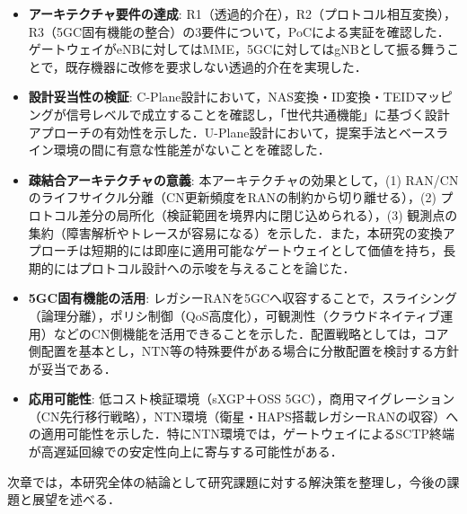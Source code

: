 \begin{itemize}
    \item \textbf{アーキテクチャ要件の達成}: R1（透過的介在），R2（プロトコル相互変換），R3（5GC固有機能の整合）の3要件について，PoCによる実証を確認した．ゲートウェイがeNBに対してはMME，5GCに対してはgNBとして振る舞うことで，既存機器に改修を要求しない透過的介在を実現した．
    \item \textbf{設計妥当性の検証}: C-Plane設計において，NAS変換・ID変換・TEIDマッピングが信号レベルで成立することを確認し，「世代共通機能」に基づく設計アプローチの有効性を示した．U-Plane設計において，提案手法とベースライン環境の間に有意な性能差がないことを確認した．
    \item \textbf{疎結合アーキテクチャの意義}: 本アーキテクチャの効果として，(1) RAN/CNのライフサイクル分離（CN更新頻度をRANの制約から切り離せる），(2) プロトコル差分の局所化（検証範囲を境界内に閉じ込められる），(3) 観測点の集約（障害解析やトレースが容易になる）を示した．また，本研究の変換アプローチは短期的には即座に適用可能なゲートウェイとして価値を持ち，長期的にはプロトコル設計への示唆を与えることを論じた．
    \item \textbf{5GC固有機能の活用}: レガシーRANを5GCへ収容することで，スライシング（論理分離），ポリシ制御（QoS高度化），可観測性（クラウドネイティブ運用）などのCN側機能を活用できることを示した．配置戦略としては，コア側配置を基本とし，NTN等の特殊要件がある場合に分散配置を検討する方針が妥当である．
    \item \textbf{応用可能性}: 低コスト検証環境（sXGP＋OSS 5GC），商用マイグレーション（CN先行移行戦略），NTN環境（衛星・HAPS搭載レガシーRANの収容）への適用可能性を示した．特にNTN環境では，ゲートウェイによるSCTP終端が高遅延回線での安定性向上に寄与する可能性がある．
\end{itemize}

次章では，本研究全体の結論として研究課題に対する解決策を整理し，今後の課題と展望を述べる．
